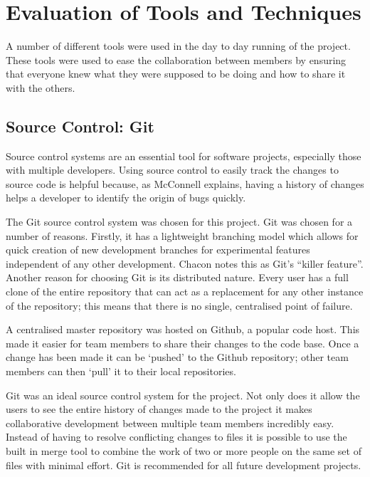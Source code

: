 \section{Evaluation of Tools and Techniques}
\label{sec:tools}

A number of different tools were used in the day to day running of the project.
These tools were used to ease the collaboration between members by ensuring that everyone knew
what they were supposed to be doing and how to share it with the others.

\subsection{Source Control: Git}

Source control systems are an essential tool for software projects, especially those
with multiple developers. Using source control to easily track the changes to source
code is helpful because, as McConnell explains, having a history of changes helps a
developer to identify the origin of bugs quickly.

The Git source control system was chosen for this project.
Git was chosen for a number of reasons. Firstly, it has a lightweight branching model which
allows for quick creation of new development branches for experimental features independent of
any other development. Chacon notes this as Git's ``killer feature''.
Another reason for choosing Git is its distributed nature. Every user has a full clone of the
entire repository that can act as a replacement for any other instance of the repository; this means
that there is no single, centralised point of failure.

A centralised master repository was hosted on Github, a popular code host.
This made it easier for team members to share their changes to the code base. Once a change has been made
it can be `pushed' to the Github repository; other team members can then `pull' it to their local
repositories.

Git was an ideal source control system for the project. Not only does it allow the users to see
the entire history of changes made to the project it makes collaborative development between
multiple team members incredibly easy. Instead of having to resolve conflicting changes to files
it is possible to use the built in merge tool to combine the work of two or more people on the
same set of files with minimal effort. Git is recommended for all future development projects.

